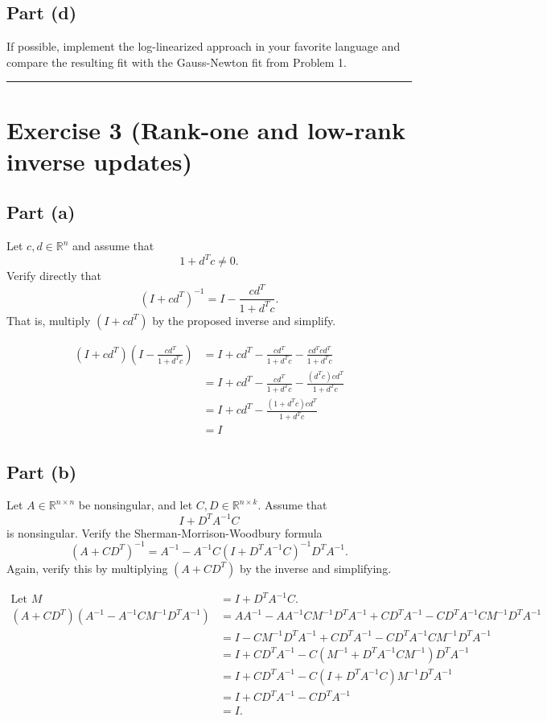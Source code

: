 
\subsection*{Part (d)}
If possible, implement the log-linearized approach in your favorite language and compare the resulting fit with the Gauss-Newton fit from Problem 1.


\vspace{0.5cm}
\hrule
\vspace{0.5cm}

\section*{Exercise 3 (Rank-one and low-rank inverse updates)}

\subsection*{Part (a)}
Let $c, d \in \mathbb{R}^n$ and assume that
\[ 1 + d^T c \neq 0. \]
Verify directly that
\[ (I + c d^T)^{-1} = I - \frac{c d^T}{1 + d^T c}. \]
That is, multiply $(I + c d^T)$ by the proposed inverse and simplify.

\[
\begin{aligned}
	(I + c d^T)\left( I - \frac{c d^T}{1 + d^T c} \right)
	&= I + c d^T - \frac{c d^T}{1 + d^T c} - \frac{c d^T c d^T}{1 + d^T c} \\
	&= I + c d^T - \frac{c d^T}{1 + d^T c} - \frac{(d^T c)c d^T}{1 + d^T c} \\
	&= I + c d^T - \frac{(1 + d^T c)c d^T}{1 + d^T c} \\
	&= I
\end{aligned}
\]

\subsection*{Part (b)}
Let $A \in \mathbb{R}^{n \times n}$ be nonsingular, and let $C, D \in \mathbb{R}^{n \times k}$. Assume that
\[ I + D^T A^{-1} C \]
is nonsingular. Verify the Sherman-Morrison-Woodbury formula
\[ (A + C D^T)^{-1} = A^{-1} - A^{-1} C (I + D^T A^{-1} C)^{-1} D^T A^{-1}. \]
Again, verify this by multiplying $(A + C D^T)$ by the inverse and simplifying.

\[
\begin{aligned}
\text{Let } M &= I + D^T A^{-1} C. \\
(A + C D^T)\left(A^{-1} - A^{-1} C M^{-1} D^T A^{-1}\right)
&= A A^{-1} - A A^{-1} C M^{-1} D^T A^{-1} + C D^T A^{-1} - C D^T A^{-1} C M^{-1} D^T A^{-1} \\
&= I - C M^{-1} D^T A^{-1} + C D^T A^{-1} - C D^T A^{-1} C M^{-1} D^T A^{-1} \\
&= I + C D^T A^{-1} - C\left(M^{-1} + D^T A^{-1} C M^{-1}\right)D^T A^{-1} \\
&= I + C D^T A^{-1} - C\left(I + D^T A^{-1} C\right)M^{-1} D^T A^{-1} \\
&= I + C D^T A^{-1} - C D^T A^{-1} \\
&= I.
\end{aligned}
\]

